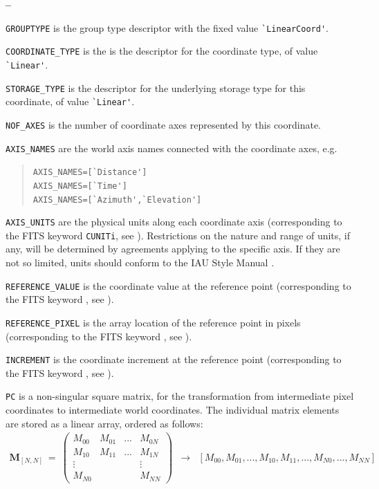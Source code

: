 \documentclass[a4paper,10pt,bibtotoc]{scrreprt}
\begin{document}
\begin{list}{\textbf{--}}{}
\item \verb|GROUPTYPE| is the group type descriptor with the fixed value
  \verb|`LinearCoord'|. 
\item \verb|COORDINATE_TYPE| is the is the descriptor for the
  coordinate type, of value \verb|`Linear'|.
\item \verb|STORAGE_TYPE| is the descriptor for the underlying storage
  type for this coordinate, of value \verb|`Linear'|.
\item \verb|NOF_AXES| is the number of coordinate axes represented by
  this coordinate.
\item \verb|AXIS_NAMES| are the world axis names connected with the
  coordinate axes, e.g.
  \begin{verse}
    \verb|AXIS_NAMES=[`Distance']| \\
    \verb|AXIS_NAMES=[`Time']| \\
    \verb|AXIS_NAMES=[`Azimuth',`Elevation']|
  \end{verse}
\item \verb|AXIS_UNITS| are the physical units along each coordinate axis
  (corresponding to the FITS keyword \verb|CUNITi|, see \cite{fits.paper1}).
  Restrictions on the nature and range of units, if any, will be determined by
  agreements applying to the specific axis. If they are not so limited, units
  should conform to the IAU Style Manual \cite{mcnally.1988}.
\item \verb|REFERENCE_VALUE| is the coordinate value at the reference point
   (corresponding to the FITS keyword , see \cite{fits.paper1}).
\item \verb|REFERENCE_PIXEL| is the array location of the reference point in 
  pixels (corresponding to the FITS keyword , see \cite{fits.paper1}).
\item \verb|INCREMENT| is the coordinate increment at the reference point
   (corresponding to the FITS keyword , see \cite{fits.paper1}).
\item \verb|PC| is a non-singular square matrix, for the
  transformation from intermediate pixel coordinates to intermediate
  world coordinates. The individual matrix elements are stored as a
  linear array, ordered as follows:
  \begin{eqnarray*}
     \mathbf{M}_{[N,N]} \ = \ \left(
       \begin{array}{cccc}
         M_{00}  & M_{01} & ... & M_{0N} \\
         M_{10}  & M_{11} & ... & M_{1N} \\
         \vdots  &       &     & \vdots \\
         M_{N0}  &        &     & M_{NN}
       \end{array}
     \right) 
     & \rightarrow &
     \left[ M_{00}, M_{01}, ... , M_{10}, M_{11}, ..., M_{N0}, ..., M_{NN} \right]
  \end{eqnarray*}
\end{list}
\end{document}
